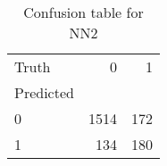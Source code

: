 \begin{table}[h!]
\caption{Confusion table for NN2}
\label{tab:NN2}
\begin{tabular}{lrr}
\toprule
Truth & 0 & 1 \\
Predicted &  &  \\
\midrule
0 & 1514 & 172 \\
1 & 134 & 180 \\
\bottomrule
\end{tabular}
\end{table}

